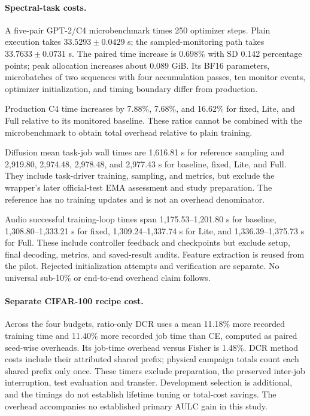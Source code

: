 \documentclass[10pt,a4paper,twocolumn]{article}
\begin{document}
\paragraph{Spectral-task costs.}
A five-pair GPT-2/C4 microbenchmark times 250 optimizer steps.
Plain execution takes $33.5293\pm0.0429$ s;
the sampled-monitoring path takes $33.7633\pm0.0731$ s.
The paired time increase is $0.698\%$ with SD 0.142
percentage points; peak allocation increases about 0.089 GiB.
Its BF16 parameters, microbatches of two sequences with
four accumulation passes, ten monitor events, optimizer
initialization, and timing boundary differ from production.

Production C4 time increases by 7.88\%, 7.68\%, and 16.62\%
for fixed, Lite, and Full relative to its monitored baseline.
These ratios cannot be combined with the microbenchmark
to obtain total overhead relative to plain training.

Diffusion mean task-job wall times are 1,616.81 s for
reference sampling and 2,919.80, 2,974.48, 2,978.48,
and 2,977.43 s for baseline, fixed, Lite, and Full.
They include task-driver training, sampling, and metrics,
but exclude the wrapper's later official-test EMA assessment
and study preparation. The reference has no training updates
and is not an overhead denominator.

Audio successful training-loop times span
1,175.53--1,201.80 s for baseline,
1,308.80--1,333.21 s for fixed,
1,309.24--1,337.74 s for Lite, and
1,336.39--1,375.73 s for Full.
These include controller feedback and checkpoints but exclude
setup, final decoding, metrics, and saved-result audits.
Feature extraction is reused from the pilot.
Rejected initialization attempts and verification are separate.
No universal sub-10\% or end-to-end overhead claim follows.


\paragraph{Separate CIFAR-100 recipe cost.}
Across the four budgets, ratio-only DCR uses a mean 11.18\% more
recorded training time and 11.40\% more recorded job time than CE,
computed as paired seed-wise overheads. Its job-time overhead versus
Fisher is 1.48\%. DCR method costs include their attributed shared
prefix; physical campaign totals count each shared prefix only once.
These timers exclude preparation, the preserved inter-job interruption,
test evaluation and transfer. Development selection is additional,
and the timings do not establish lifetime tuning or total-cost savings.
The overhead accompanies no established primary AULC gain in this study.
\end{document}
